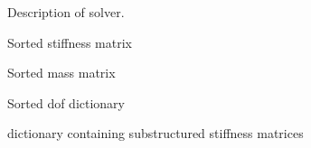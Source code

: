 \documentclass[letterpaper,10pt,english]{sphinxmanual}
\begin{document}
\begin{fulllineitems}
\begin{fulllineitems}
\label{\detokenize{model:pywfe.Model.solver}}
\pysigstartsignatures
{}
\pysigstopsignatures
\sphinxAtStartPar
Description of solver.

\end{fulllineitems}


\begin{fulllineitems}
\label{\detokenize{model:pywfe.Model.K}}
\pysigstartsignatures
{}
\pysigstopsignatures
\sphinxAtStartPar
Sorted stiffness matrix

\end{fulllineitems}


\begin{fulllineitems}
\label{\detokenize{model:pywfe.Model.M}}
\pysigstartsignatures
{}
\pysigstopsignatures
\sphinxAtStartPar
Sorted mass matrix

\end{fulllineitems}


\begin{fulllineitems}
\label{\detokenize{model:pywfe.Model.dof}}
\pysigstartsignatures
{}
\pysigstopsignatures
\sphinxAtStartPar
Sorted dof dictionary

\end{fulllineitems}


\begin{fulllineitems}
\label{\detokenize{model:pywfe.Model.K_sub}}
\pysigstartsignatures
{}
\pysigstopsignatures
\sphinxAtStartPar
dictionary containing substructured stiffness matrices 


\end{fulllineitems}
\end{fulllineitems}
\end{document}

